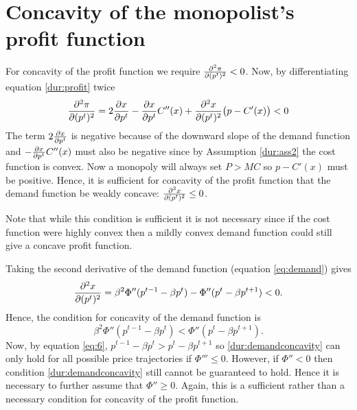 \chapter[Concavity proof]{Concavity of the monopolist's profit function}
\label{cha:Assumpproof}

For concavity of the profit function we require $\frac{\partial^2 \pi}{\partial (p^t)^2} <
0$. Now, by differentiating equation \eqref{dur:profit} twice
\begin{equation}
    \frac{\partial^2 \pi}{\partial (p^t)^2} = 2 \frac{\partial x}{\partial p^t}  - \frac{\partial x}{\partial p^t} C''(x) + \frac{\partial^2 x}{\partial (p^t)^2} \bigl( p - C'(x)
    \bigr) < 0
\end{equation}
The term $2 \frac{\partial x}{\partial p^t}$ is negative because of the downward slope
of the demand function and $- \frac{\partial x}{\partial p^t} C''(x)$ must also be
negative since by Assumption \ref{dur:ass2} the cost function is
convex. Now a monopoly will always set $P > MC$ so $p - C'(x)$ must
be positive. Hence, it is sufficient for concavity of the profit
function that the demand function be weakly concave:
$\frac{\partial^2 x}{\partial (p^t)^2} \leq 0$.

Note that while this condition is sufficient it is not necessary
since if the cost function were highly convex then a mildly convex
demand function could still give a concave profit function.

Taking the second derivative of the demand function (equation
\eqref{eq:demand}) gives
\begin{equation}
    \frac{\partial^2 x}{\partial (p^t)^2} = \beta^2 \Phi''(p^{t-1} - \beta p^t) -
    \Phi''(p^t - \beta p^{t+1}) < 0.
\end{equation}
Hence, the condition for concavity of the demand function is
\begin{equation}    \label{dur:demandconcavity}
    \beta^2 \Phi''(p^{t-1} - \beta p^t) < \Phi''(p^t - \beta
    p^{t+1}).
\end{equation}
Now, by equation \eqref{eq:6}, $p^{t-1} - \beta p^t > p^t - \beta
p^{t+1}$ so \eqref{dur:demandconcavity} can only hold for all
possible price trajectories if $\Phi''' \leq 0$. However, if $\Phi''
< 0$ then condition \eqref{dur:demandconcavity} still cannot be
guaranteed to hold. Hence it is necessary to further assume that
$\Phi'' \geq 0$. Again, this is a sufficient rather than a necessary
condition for concavity of the profit function.


